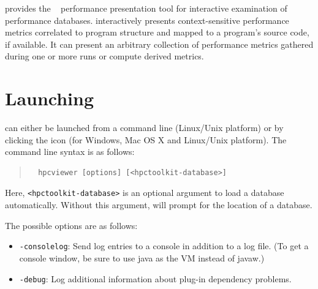 

\HPCToolkit{} provides the \hpcviewer{}~\cite{Adhianto-MC-Ta:2010:PSTI-hpcviewer} performance presentation tool for interactive examination of performance databases.
\hpcviewer{} interactively presents context-sensitive performance metrics correlated to program structure and mapped to a program's source code, if available.
It can present an arbitrary collection of performance metrics gathered during one or more runs or compute derived metrics.



\section{Launching}

\hpcviewer{} can either be launched from a command line (Linux/Unix platform) or by clicking the \hpcviewer{} icon (for Windows, Mac OS X and Linux/Unix platform).
The command line syntax is as follows:
\begin{quote}
\begin{verbatim}
  hpcviewer [options] [<hpctoolkit-database>]
\end{verbatim}
\end{quote}
Here, \texttt{<hpctoolkit-database>} is an optional argument to load a database automatically.
Without this argument, \hpcviewer{} will prompt for the location of a database.

The possible options are as follows:
\begin{itemize}
 \item \texttt{-consolelog}: Send log entries to a console in addition to a log file.
   (To get a console window, be sure to use java as the VM instead of javaw.)

 \item \texttt{-debug}: Log additional information about plug-in dependency problems.
\end{itemize}



